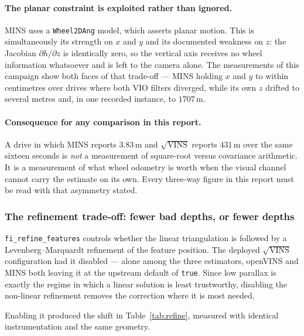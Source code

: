 \paragraph{The planar constraint is exploited rather than ignored.} MINS uses
a \texttt{Wheel2DAng} model, which asserts planar motion. This is
simultaneously its strength on $x$ and $y$ and its documented weakness on
$z$: the Jacobian $\partial h/\partial z$ is identically zero, so the vertical
axis receives no wheel information whatsoever and is left to the camera alone.
The measurements of this campaign show both faces of that trade-off --- MINS
holding $x$ and $y$ to within centimetres over drives where both VIO filters
diverged, while its own $z$ drifted to several metres and, in one recorded
instance, to $1707\,\mathrm{m}$.

\paragraph{Consequence for any comparison in this report.} A drive in which
MINS reports $3.83\,\mathrm{m}$ and $\sqrt{\text{VINS}}$ reports
$431\,\mathrm{m}$ over the same sixteen seconds is \emph{not} a measurement of
square-root versus covariance arithmetic. It is a measurement of what wheel
odometry is worth when the visual channel cannot carry the estimate on its
own. Every three-way figure in this report must be read with that asymmetry
stated.

\subsubsection{The refinement trade-off: fewer bad depths, or fewer depths}

\texttt{fi\_refine\_features} controls whether the linear triangulation is
followed by a Levenberg--Marquardt refinement of the feature position. The
deployed $\sqrt{\text{VINS}}$ configuration had it disabled --- alone among
the three estimators, openVINS and MINS both leaving it at the upstream
default of \texttt{true}. Since low parallax is exactly the regime in which a
linear solution is least trustworthy, disabling the non-linear refinement
removes the correction where it is most needed.

Enabling it produced the shift in Table~\ref{tab:refine}, measured with
identical instrumentation and the same geometry.

